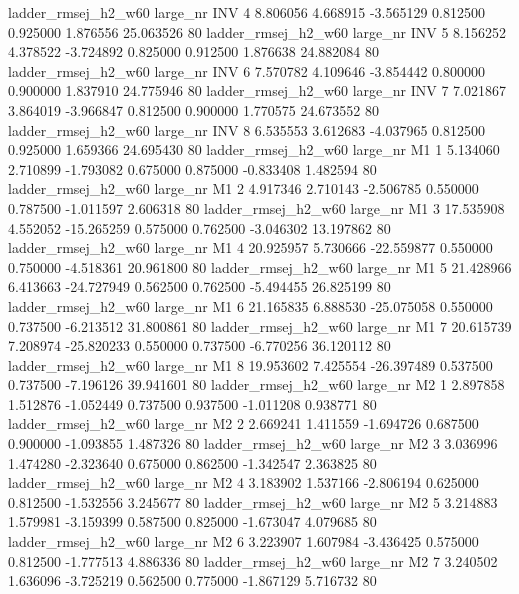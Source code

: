 ladder_rmsej_h2_w60   large_nr      INV                 4  8.806056  4.668915  -3.565129 0.812500 0.925000  1.876556   25.063526 80
ladder_rmsej_h2_w60   large_nr      INV                 5  8.156252  4.378522  -3.724892 0.825000 0.912500  1.876638   24.882084 80
ladder_rmsej_h2_w60   large_nr      INV                 6  7.570782  4.109646  -3.854442 0.800000 0.900000  1.837910   24.775946 80
ladder_rmsej_h2_w60   large_nr      INV                 7  7.021867  3.864019  -3.966847 0.812500 0.900000  1.770575   24.673552 80
ladder_rmsej_h2_w60   large_nr      INV                 8  6.535553  3.612683  -4.037965 0.812500 0.925000  1.659366   24.695430 80
ladder_rmsej_h2_w60   large_nr       M1                 1  5.134060  2.710899  -1.793082 0.675000 0.875000 -0.833408    1.482594 80
ladder_rmsej_h2_w60   large_nr       M1                 2  4.917346  2.710143  -2.506785 0.550000 0.787500 -1.011597    2.606318 80
ladder_rmsej_h2_w60   large_nr       M1                 3 17.535908  4.552052 -15.265259 0.575000 0.762500 -3.046302   13.197862 80
ladder_rmsej_h2_w60   large_nr       M1                 4 20.925957  5.730666 -22.559877 0.550000 0.750000 -4.518361   20.961800 80
ladder_rmsej_h2_w60   large_nr       M1                 5 21.428966  6.413663 -24.727949 0.562500 0.762500 -5.494455   26.825199 80
ladder_rmsej_h2_w60   large_nr       M1                 6 21.165835  6.888530 -25.075058 0.550000 0.737500 -6.213512   31.800861 80
ladder_rmsej_h2_w60   large_nr       M1                 7 20.615739  7.208974 -25.820233 0.550000 0.737500 -6.770256   36.120112 80
ladder_rmsej_h2_w60   large_nr       M1                 8 19.953602  7.425554 -26.397489 0.537500 0.737500 -7.196126   39.941601 80
ladder_rmsej_h2_w60   large_nr       M2                 1  2.897858  1.512876  -1.052449 0.737500 0.937500 -1.011208    0.938771 80
ladder_rmsej_h2_w60   large_nr       M2                 2  2.669241  1.411559  -1.694726 0.687500 0.900000 -1.093855    1.487326 80
ladder_rmsej_h2_w60   large_nr       M2                 3  3.036996  1.474280  -2.323640 0.675000 0.862500 -1.342547    2.363825 80
ladder_rmsej_h2_w60   large_nr       M2                 4  3.183902  1.537166  -2.806194 0.625000 0.812500 -1.532556    3.245677 80
ladder_rmsej_h2_w60   large_nr       M2                 5  3.214883  1.579981  -3.159399 0.587500 0.825000 -1.673047    4.079685 80
ladder_rmsej_h2_w60   large_nr       M2                 6  3.223907  1.607984  -3.436425 0.575000 0.812500 -1.777513    4.886336 80
ladder_rmsej_h2_w60   large_nr       M2                 7  3.240502  1.636096  -3.725219 0.562500 0.775000 -1.867129    5.716732 80
